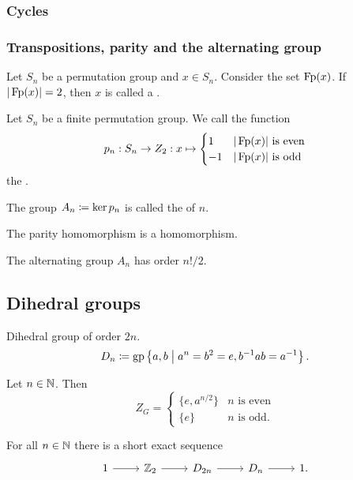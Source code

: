 \subsubsection{Cycles}
\subsubsection{Transpositions, parity and the alternating group}
\begin{definition}
Let $S_n$ be a permutation group and $x\in S_n$. Consider the set $\operatorname{Fp}(x)$. If $|\operatorname{Fp}(x)| = 2$, then $x$ is called a .
\end{definition}

\begin{definition}
Let $S_n$ be a finite permutation group. We call the function
\[ p_n: S_n \to Z_2: x\mapsto \begin{cases}
1 & \text{$|\operatorname{Fp}(x)|$ is even} \\
-1 & \text{$|\operatorname{Fp}(x)|$ is odd}
\end{cases} \]
the .

The group $A_n \coloneqq \ker p_n$ is called the  of  $n$.
\end{definition}

\begin{proposition}
The parity homomorphism is a homomorphism.
\end{proposition}

\begin{lemma}
The alternating group $A_n$ has order $n!/2$.
\end{lemma}

\subsection{Dihedral groups}
\begin{definition}
Dihedral group of order $2n$.
\[ D_n \coloneqq \operatorname{gp}\left\{  a,b  \;\middle|\; a^n=b^2=e, b^{-1}ab = a^{-1}  \right\}. \]
\end{definition}

\begin{proposition}
Let $n\in \mathbb{N}$. Then
\[ Z_G = \begin{cases}
\{e, a^{n/2}\} & \text{$n$ is even} \\
\{e\} & \text{$n$ is odd}.
\end{cases} \]
\end{proposition}
\begin{corollary} \label{dihedralDoubleCover}
For all $n\in \mathbb{N}$ there is a short exact sequence
\[ \begin{tikzcd}
1 \rar & \Z_2 \rar & D_{2n} \rar & D_n \rar & 1.
\end{tikzcd} \]
\end{corollary}

